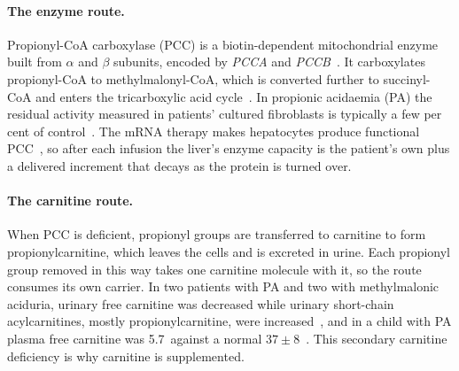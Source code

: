 \paragraph{The enzyme route.} Propionyl-CoA carboxylase (PCC) is a biotin-dependent
mitochondrial enzyme built from $\alpha$ and $\beta$ subunits, encoded by \emph{PCCA} and
\emph{PCCB}~\cite{pcc_structure}. It carboxylates propionyl-CoA to methylmalonyl-CoA,
which is converted further to succinyl-CoA and enters the tricarboxylic acid
cycle~\cite{pa_guidelines}. In propionic acidaemia (PA) the residual
activity measured in patients' cultured fibroblasts is typically a few per cent of
control~\cite{pcc_residual_activity}. The mRNA therapy makes hepatocytes produce
functional PCC~\cite{jiang2020dual,mrna_moa}, so after each infusion the liver's enzyme
capacity is the patient's own plus a delivered increment that decays as the protein is
turned over.

\paragraph{The carnitine route.} When PCC is deficient, propionyl groups are transferred to
carnitine to form propionylcarnitine, which leaves the cells and is excreted in urine. Each
propionyl group removed in this way takes one carnitine molecule with it, so the route
consumes its own carrier. In two patients with PA and two with methylmalonic aciduria,
urinary free carnitine was decreased while urinary short-chain acylcarnitines, mostly
propionylcarnitine, were increased~\cite{carnitine_excretion_pa}, and in a child with PA
plasma free carnitine was 5.7\uM\ against a normal $37\pm8$\uM~\cite{carnitine_pa_child}.
This secondary carnitine deficiency is why carnitine is supplemented.

